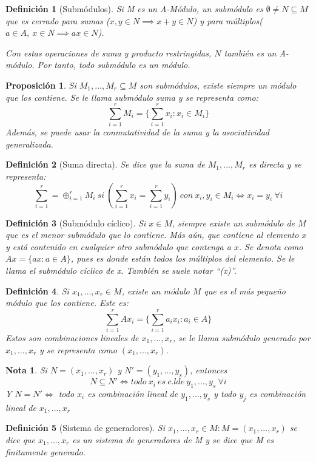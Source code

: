 \documentclass[11pt, a4paper, titlepage]{article}
\theoremstyle{theorem-style}
\newtheorem*{nprop}{Proposición}
\theoremstyle{definition-style}
\newtheorem*{ndef}{Definición}
\theoremstyle{remark-style}
\newtheorem*{nota}{Nota}
\theoremstyle{example-style}
\begin{document}
\begin{ndef}[Submódulos]
	Si M es un A-Módulo, un submódulo es $\emptyset \ne N \subseteq M$ que es cerrado para sumas ($x,y\in N \implies x+y \in N$) y para múltiplos($a\in A,\ x\in N \implies ax\in N$).
	
	Con estas operaciones de suma y producto restringidas, $N$ también es un A-módulo. Por tanto, todo submódulo es un módulo.
\end{ndef}
\begin{nprop}
	Si $M_1,...,M_r \subseteq M$ son submódulos, existe siempre un módulo que los contiene. Se le llama submódulo suma y se representa como:
	\[
	\sum_{i=1}^r M_i =\{\sum_{i=1}^r x_i : x_i \in M_i\}
	\]
	Además, se puede usar la conmutatividad de la suma y la asociatividad generalizada.

\end{nprop}
\begin{ndef}[Suma directa]
	Se dice que la suma de $M_1,...,M_r$ es directa y se representa:
	\[
	\sum_{i=1}^r = \oplus_{i=1}^r M_i \ si \ (\sum_{i=1}^r x_i =  \sum_{i=1}^r y_i) \ con \ x_i,y_i \in M_i \iff x_i = y_i\ \forall i	\]
\end{ndef}
\begin{ndef}[Submódulo cíclico]
	Si $x\in M$, siempre existe un submódulo de $M$ que es el menor submódulo que lo contiene. Más aún, que contiene al elemento $x$ y está contenido en cualquier otro submódulo que contenga a $x$. Se denota como $Ax = \{ax : a \in A\}$, pues es donde están todos los múltiplos del elemento. Se le llama el submódulo cíclico de x. También se suele notar “(x)”.
\end{ndef}
\begin{ndef}
	Si $x_1,...,x_r \in M$, existe un módulo $M$ que es el más pequeño módulo que los contiene. Este es:
	\[
	\sum_{i=1}^r Ax_i = \{\sum_{i=1}^r a_ix_i : a_i \in A\}
	\]
	Estos son combinaciones lineales de $x_1,...,x_r$, se le llama submódulo generado por $x_1,...,x_r$ y se representa como $(x_1,...,x_r)$.
\end{ndef}
\begin{nota}
	Si $N=(x_1,...,x_r)$ y $N'= (y_1,...,y_s)$, entonces
	\[
	N \subseteq N' \iff todo\ x_i \ es \ c.l de \ y_1,...,y_s \ \forall i
	\]
	Y $N=N'\iff$ todo $x_i$ es combinación lineal de $y_1,...,y_s$ y todo $y_j$ es combinación lineal de $x_1,...,x_r$
\end{nota}
\begin{ndef}[Sistema de generadores]
	Si $x_1,...,x_r\in M : M = (x_1,...,x_r)$ se dice que $x_1,...,x_r$ es un sistema de generadores de M  y se dice que M es finitamente generado.
\end{ndef}
\end{document}
